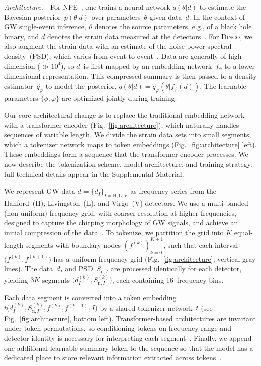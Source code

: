 \documentclass[aps,prl,twocolumn,nofootinbib,longbibliography,amsfonts,amssymb,amsmath,superscriptaddress]{revtex4-2}
\newcommand{\dingo}{\textsc{Dingo}\xspace}
\renewcommand{\sec}[1]{\emph{#1.---}}
\begin{document}
\sec{Architecture}For NPE~\cite{papamakarios:2016, lueckmann:2017, greenberg_lfi:2019}, one trains a neural network $q(\theta|d)$ to estimate the Bayesian posterior~$p(\theta|d)$ over parameters~$\theta$ given data~$d$. 
In the context of GW single-event inference, $\theta$ denotes the source parameters, e.g., of a black hole binary, and $d$ denotes the strain data measured at the detectors~\cite{LIGOScientific:2019hgc}. 
For \dingo, we also augment the strain data with an estimate of the noise power spectral density~(PSD), which varies from event to event~\cite{dax_dingo:2021}. 
Data are generally of high dimension \mbox{($\gg 10^4$)}, so $d$~is first mapped by an embedding network~$f_{\phi}$ to a lower-dimensional representation. This compressed summary is then passed to a density estimator~$\hat{q}_{\varphi}$ to model the posterior, $q(\theta|d)=\hat{q}_{\varphi}(\theta|f_{\phi}(d))$.
The learnable parameters $\{\phi,\varphi\}$ are optimized jointly during training.

Our core architectural change is to replace the traditional embedding network with a transformer encoder (Fig.~\ref{fig:architecture}), which naturally handles sequences of variable length. We divide the strain data sets into small segments, which a tokenizer network maps to token embeddings (Fig.~\ref{fig:architecture} left). These embeddings form a sequence that the transformer encoder processes. 
We now describe the tokenization scheme, model architecture, and training strategy; full technical details appear in the Supplemental Material.

We represent GW data $d = \{d_I\}_{I=\mathrm{H,L,V}}$ as frequency series from the Hanford~(H), Livingston~(L), and Virgo~(V) detectors. 
We use a multi-banded (non-uniform) frequency grid, with coarser resolution at higher frequencies, designed to capture the chirping morphology of GW signals, and achieve an initial compression of the data~\citep{vinciguerra_mb:2017,morisaki:2021,dax_bns:2025}. To tokenize, we partition the grid into $K$ equal-length segments with boundary nodes $(f^{(k)})_{k=0}^{K+1}$, such that each interval $\big(f^{(k)}, f^{(k+1)}\big)$ has a uniform frequency grid (Fig.~\ref{fig:architecture}, vertical gray lines).
The data~$d_I$ and PSD~$S_{\mathrm{n},I}$ are processed identically for each detector, yielding $3K$ segments $\big(d_I^{(k)}, S_{\mathrm{n},I}^{(k)}\big)$, each containing 16~frequency bins. %

Each data segment is converted into a token embedding $ t\big(d_I^{(k)}, S_{\mathrm{n},I}^{(k)}, f^{(k)}, f^{(k+1)}, I\big)$ by a shared tokenizer network~$t$ (see Fig.~\ref{fig:architecture}, bottom left).
Transformer-based architectures are invariant under token permutations, so conditioning tokens on frequency range and detector identity is necessary for interpreting each segment~\citep{dauphin_glu:2017}. 
Finally, we append one additional learnable summary token to the sequence so that the model has a dedicated place to store relevant information extracted across tokens~\citep{devlin:2019, darcet_registers:2024}.
\end{document}
